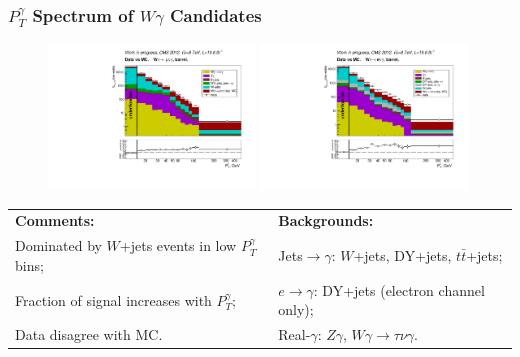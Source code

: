 \begin{frame}\frametitle{$P_T^{\gamma}$ Spectrum of $W\gamma$ Candidates}
  \begin{figure}[htb]
    \begin{center}
       \includegraphics[width=0.49\textwidth]{../figs/figs_v11/MUON_WGamma/PrepareYields/c_TotalDATAvsMC_Barrel__phoEt.pdf} \includegraphics[width=0.49\textwidth]{../figs/figs_v11/ELECTRON_WGamma/PrepareYields/c_TotalDATAvsMC_Barrel__phoEt.pdf} 
    \end{center}
  \end{figure}

\tiny
  \begin{table}[h]
     \tiny
     \begin{center}
     \begin{tabular}{|l|l|}
     \hline
     {\bfseries{Comments:}} &  {\bfseries{ Backgrounds:}}\\ 
     Dominated by $W$+jets events in low $P_T^{\gamma}$ bins; & Jets$\rightarrow\gamma$: $W$+jets, DY+jets, $t\bar{t}$+jets;\\
     Fraction of signal increases with $P_T^{\gamma}$; & $e\rightarrow\gamma$: DY+jets (electron channel only);\\
     Data disagree with MC.          & Real-$\gamma$: $Z\gamma$, $W\gamma\rightarrow\tau\nu\gamma$.\\
     \hline
      \end{tabular}
      \end{center}
  \end{table}

\end{frame}


